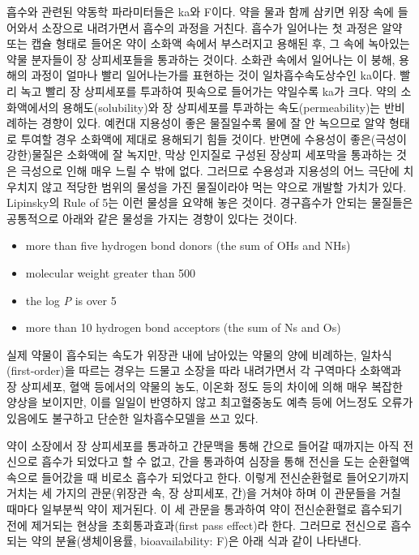\documentclass[
  11pt,
  krantz2, a4paper, twoside]{krantz}
\providecommand{\tightlist}{%
  \setlength{\itemsep}{0pt}\setlength{\parskip}{0pt}}
\begin{document}
흡수와 관련된 약동학 파라미터들은 ka와 F이다. 약을 물과 함께 삼키면 위장
속에 들어와서 소장으로 내려가면서 흡수의 과정을 거친다. 흡수가 일어나는
첫 과정은 알약 또는 캡슐 형태로 들어온 약이 소화액 속에서 부스러지고
용해된 후, 그 속에 녹아있는 약물 분자들이 장 상피세포들을 통과하는
것이다. 소화관 속에서 일어나는 이 붕해, 용해의 과정이 얼마나 빨리
일어나는가를 표현하는 것이 일차흡수속도상수인 ka이다. 빨리 녹고 빨리 장
상피세포를 투과하여 핏속으로 들어가는 약일수록 ka가 크다. 약의
소화액에서의 용해도(solubility)와 장 상피세포를 투과하는
속도(permeability)는 반비례하는 경향이 있다. 예컨대 지용성이 좋은
물질일수록 물에 잘 안 녹으므로 알약 형태로 투여할 경우 소화액에 제대로
용해되기 힘들 것이다. 반면에 수용성이 좋은(극성이 강한)물질은 소화액에
잘 녹지만, 막상 인지질로 구성된 장상피 세포막을 통과하는 것은 극성으로
인해 매우 느릴 수 밖에 없다. 그러므로 수용성과 지용성의 어느 극단에
치우치지 않고 적당한 범위의 물성을 가진 물질이라야 먹는 약으로 개발할
가치가 있다. Lipinsky의 Rule of 5는 이런 물성을 요약해 놓은 것이다.
경구흡수가 안되는 물질들은 공통적으로 아래와 같은 물성을 가지는 경향이
있다는 것이다.

\begin{itemize}
\tightlist
\item
  more than five hydrogen bond donors (the sum of OHs and NHs)
\item
  molecular weight greater than 500
\item
  the log \emph{P} is over 5
\item
  more than 10 hydrogen bond acceptors (the sum of Ns and Os)
\end{itemize}

실제 약물이 흡수되는 속도가 위장관 내에 남아있는 약물의 양에 비례하는,
일차식(first-order)을 따르는 경우는 드물고 소장을 따라 내려가면서 각
구역마다 소화액과 장 상피세포, 혈액 등에서의 약물의 농도, 이온화 정도
등의 차이에 의해 매우 복잡한 양상을 보이지만, 이를 일일이 반영하지 않고
최고혈중농도 예측 등에 어느정도 오류가 있음에도 불구하고 단순한
일차흡수모델을 쓰고 있다.

약이 소장에서 장 상피세포를 통과하고 간문맥을 통해 간으로 들어갈
때까지는 아직 전신으로 흡수가 되었다고 할 수 없고, 간을 통과하여 심장을
통해 전신을 도는 순환혈액 속으로 들어갔을 때 비로소 흡수가 되었다고
한다. 이렇게 전신순환혈로 들어오기까지 거치는 세 가지의 관문(위장관 속,
장 상피세포, 간)을 거쳐야 하며 이 관문들을 거칠 때마다 일부분씩 약이
제거된다. 이 세 관문을 통과하여 약이 전신순환혈로 흡수되기 전에 제거되는
현상을 초회통과효과(first pass effect)라 한다. 그러므로 전신으로
흡수되는 약의 분율(생체이용률, bioavailability: F)은 아래 식과 같이
나타낸다.
\end{document}
